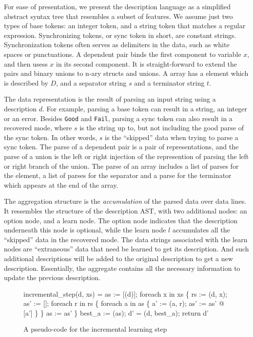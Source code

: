 For ease of presentation, we present the description language as a simplified abstract
syntax tree that resembles a subset of \pads{} features. We assume just two types of base tokens: 
an integer token, and a string token that matches a
regular expression. Synchronizing tokens, or sync token in short, are constant strings. 
Synchronization tokens often
serves as delimiters in the data, such as white spaces or punctuations.
A dependent pair binds
the first component to variable $x$, and then usess $x$ in its second component. It is 
straight-forward to extend the pairs and binary unions to n-ary structs and unions.
A array has a element which is described by $D$, and a separator string $s$ and a
terminator string $t$. 

The data representation is the result of parsing an input string using a description $d$.
For example, parsing a base token can result in a string, an integer or an error.
Besides {\tt Good} and {\tt Fail}, parsing a sync token can also result in 
a recovered mode, where $s$ is the string up to, but not including the good parse of the
sync token. In other words, $s$ is the ``skipped'' data when trying to parse a sync token.
The parse of a dependent pair is a pair of representations, and the
parse of a union is the left or right injection of the represention of parsing the left or
right branch of the union. The parse of an array includes a list of parses for the element,
a list of parses for the separator and a parse for the terminator which appears at the end of
the array.

The aggregation structure is the {\em accumulation} of the parsed data over data lines.
It ressembles the structure of the description AST, with two additional nodes: an option
node, and a learn node. The option node indicates that the description underneath this node is
optional, while the learn node $l$ accumulates all the ``skipped'' data in the recovered mode.
The data strings associated with the learn nodes are ``extraneous'' data that need be learned to
get its description. And such additional descriptions will be added to the original description
to get a new description. Essentially, the aggregate contains all the necessary information
to update the previous description.

\begin{figure}[t]
\begin{codebox}
incremental_step(d, xs) =
  as := [(d)];
  foreach x in xs \{
    rs := (d, x);
    as' := [];
    foreach r in rs \{
      foreach a in as \{
        a' := (a, r); 
        as' := as' @ [a']
      \}
    \}
    as := as'
  \} 
  best_a := (as);
  d' = (d, best_a);  
  return d'
\end{codebox}
\caption{A pseudo-code for the incremental learning step}
\label{fig:inc-learning}
\end{figure}

